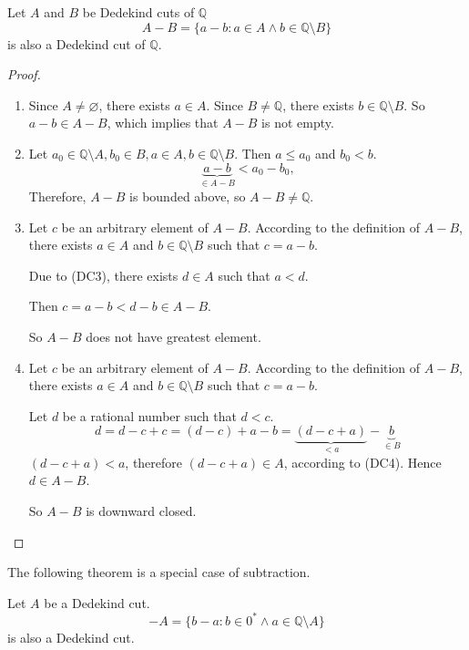 \begin{theorem}[Subtraction]
    Let $A$ and $B$ be Dedekind cuts of $\mathbb{Q}$
    \[
        A - B = \{ a - b: a\in A\land b\in\mathbb{Q}\setminus B \}
    \]
    is also a Dedekind cut of $\mathbb{Q}$.
\end{theorem}

\begin{proof}
    \begin{enumerate}[label = (\roman*)]
        \item Since $A\ne\varnothing$, there exists $a\in A$. Since $B\ne\mathbb{Q}$, there exists $b\in\mathbb{Q}\setminus B$. So $a - b\in A - B$, which implies that $A - B$ is not empty.
        \item Let $a_{0}\in\mathbb{Q}\setminus A, b_{0}\in B, a\in A, b\in\mathbb{Q}\setminus B$. Then $a\le a_{0}$ and $b_{0} < b$.
              \[
                  \underbrace{a - b}_{\in A - B} < a_{0} - b_{0},
              \]
              Therefore, $A - B$ is bounded above, so $A - B\ne\mathbb{Q}$.
        \item Let $c$ be an arbitrary element of $A - B$. According to the definition of $A - B$, there exists $a\in A$ and $b\in\mathbb{Q}\setminus B$ such that $c = a - b$.

              Due to (DC3), there exists $d\in A$ such that $a < d$.

              Then $c = a - b < d - b \in A - B$.

              So $A - B$ does not have greatest element.
        \item Let $c$ be an arbitrary element of $A - B$. According to the definition of $A - B$, there exists $a\in A$ and $b\in\mathbb{Q}\setminus B$ such that $c = a - b$.

              Let $d$ be a rational number such that $d < c$.
              \[
                  d = d - c + c = (d - c) + a - b = \underbrace{(d - c + a)}_{< a} - \underbrace{b}_{\in B}
              \]
              $(d - c + a) < a$, therefore $(d - c + a)\in A$, according to (DC4). Hence $d\in A - B$.

              So $A - B$ is downward closed.
    \end{enumerate}
\end{proof}

The following theorem is a special case of subtraction.

\begin{theorem}
    Let $A$ be a Dedekind cut.
    \[
        -A = \{ b - a : b\in{0}^{*} \wedge a\in\mathbb{Q}\setminus A \}
    \]
    is also a Dedekind cut.
\end{theorem}

